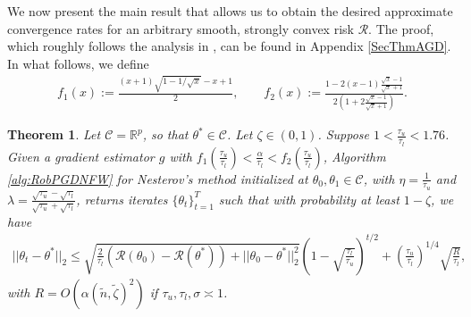 \documentclass{article}
\newtheorem{theorem}{Theorem}
\newtheorem{remark}{\textbf{Remark}}
\begin{document}

We now present the main result that allows us to obtain the desired approximate convergence rates for an arbitrary smooth, strongly convex risk $\mathcal{R}$.
The proof, which roughly follows the analysis in \cite{Recht}, can be found in Appendix \ref{SecThmAGD}.
In what follows, we define
\begin{align*}
f_1(x) := \frac{(x + 1)\sqrt{1 - 1/\sqrt{x}} - x + 1}{2}, \qquad
f_2(x) := \frac{1 - 2(x - 1)\frac{\sqrt{x} - 1}{\sqrt{x} + 1}}{2\left(1 + 2\frac{\sqrt{x} - 1}{\sqrt{x} + 1}\right)}.
\end{align*}

\begin{theorem}
\label{theorem:AGD}
Let $\mathcal{C} = \mathbb{R}^p$, so that $\theta^* \in \mathcal{C}$. Let $\zeta \in (0, 1)$. Suppose $1 < \frac{\tau_u}{\tau_l} < 1.76$.
Given a gradient estimator $g$ with $f_1\left(\frac{\tau_u}{\tau_l}\right) < \frac{\alpha}{\tau_l} < f_2\left(\frac{\tau_u}{\tau_l}\right)$, Algorithm \ref{alg:RobPGDNFW} for Nesterov's method initialized at $\theta_0, \theta_1 \in \mathcal{C}$, with $\eta = \frac{1}{\tau_u}$ and $\lambda = \frac{\sqrt{\tau_u} - \sqrt{\tau_l}}{\sqrt{\tau_u} + \sqrt{\tau_l}}$, returns iterates $\{\theta_t\}_{t = 1}^T$ such that with probability at least $1 - \zeta$, we have 
\begin{align*}
||\theta_t - \theta^*||_2 \leq \sqrt{\frac{2}{\tau_l}\left(\mathcal{R}(\theta_0) - \mathcal{R}(\theta^*)\right) + ||\theta_0 - \theta^*||_2^2}\left(1 - \sqrt{\frac{\tau_l}{\tau_u}}\right)^{t/2} + \left(\frac{\tau_u}{\tau_l}\right)^{1/4}\sqrt{\frac{R}{\tau_l}},
\end{align*}
with $R = O\left(\alpha(\widetilde{n}, \widetilde{\zeta})^2\right)$ if $\tau_u, \tau_l, \sigma \asymp 1$.
\end{theorem}
\end{document}
